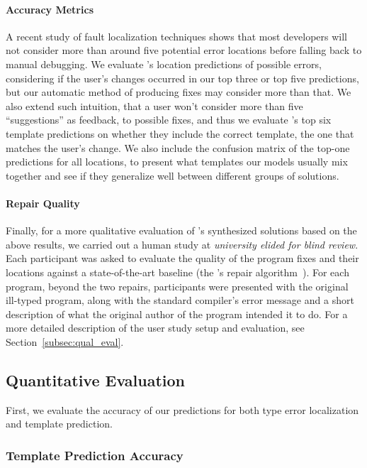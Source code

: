 \paragraph{Accuracy Metrics}
A recent study of fault localization techniques \citep[][]{Kochhar2016-oc} shows
that most developers will not consider more than around five potential error
locations before falling back to manual debugging. We evaluate \toolname's
location predictions of possible errors, considering if the user's changes
occurred in our top three or top five predictions, but our automatic method of
producing fixes may consider more than that. We also extend such intuition, that
a user won't consider more than five ``suggestions'' as feedback, to possible
fixes, and thus we evaluate \toolname's top six template predictions on whether
they include the correct template, \ie the one that matches the user's change. We also
include the confusion matrix of the top-one predictions for all locations,
to present what templates our models usually mix together and see if they
generalize well between different groups of solutions.

\paragraph{Repair Quality}
Finally, for a more qualitative evaluation of \toolname's synthesized solutions
based on the above results, we carried out a human study at \emph{university
elided for blind review}. Each participant was asked to evaluate the quality of
the program fixes and their locations against a state-of-the-art baseline (the
\seminal's repair algorithm~\citep{Lerner2006-pj, Lerner2007-dt}). For each
program, beyond the two repairs, participants were presented with the original
ill-typed program, along with the standard \ocaml compiler's error message and a
short description of what the original author of the program intended it to do.
For a more detailed description of the user study setup and evaluation,
see Section~\ref{subsec:qual_eval}.

\subsection{Quantitative Evaluation}
\label{subsec:quan_eval}

First, we evaluate the accuracy of our predictions for both type error
localization and template prediction.


\subsubsection{Template Prediction Accuracy}
\label{subsubsec:templ_acc}


